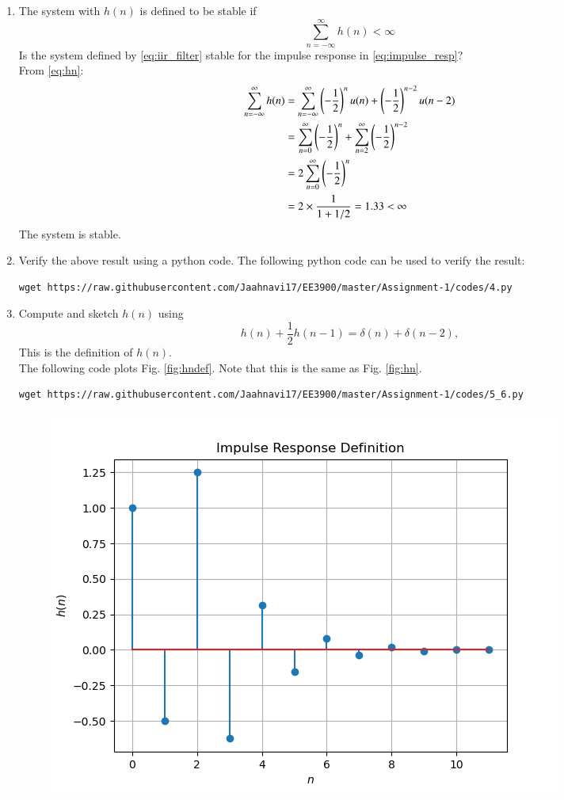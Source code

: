 \documentclass[journal,12pt,twocolumn]{IEEEtran}
\renewcommand\thesection{\arabic{section}}
\begin{document}
\begin{enumerate}[label=\thesection.\arabic*]
%
\item The system with $h(n)$ is defined to be stable if
\begin{equation}
\sum_{n=-\infty}^{\infty}h(n) < \infty
\end{equation}
Is the system defined by \eqref{eq:iir_filter} stable for the impulse response in \eqref{eq:impulse_resp}?
%
\\\solution
From \eqref{eq:hn}:
\begin{align}
    \sum_{n=-\infty}^{\infty} h(n) &= \sum_{n=-\infty}^{\infty}\left(-\frac{1}{2}\right)^{n}u(n) + \left(-\frac{1}{2}\right)^{n-2}u(n-2)\\
    &= \sum_{n=0}^{\infty}\left(-\frac{1}{2}\right)^{n} + \sum_{n=2}^{\infty}\left(-\frac{1}{2}\right)^{n-2}\\
    &= 2\sum_{n=0}^{\infty}\left(-\frac{1}{2}\right)^{n}\\
    &= 2\times\frac{1}{1+1/2}
    = 1.33 < \infty
\end{align}
The system is stable.
\item Verify the above result using a python code.
\solution The following python code can be used to verify the result:
\begin{lstlisting}
wget https://raw.githubusercontent.com/Jaahnavi17/EE3900/master/Assignment-1/codes/4.py
\end{lstlisting}
\item 
Compute and sketch $h(n)$ using 
\begin{equation}
\label{eq:iir_filter_h}
h(n) + \frac{1}{2}h(n-1) = \delta(n) + \delta(n-2), 
\end{equation}
%
This is the definition of $h(n)$.
\\
\solution The following code plots Fig. \ref{fig:hndef}. Note that this is the same as Fig. 
\ref{fig:hn}. 
%
\begin{lstlisting}
wget https://raw.githubusercontent.com/Jaahnavi17/EE3900/master/Assignment-1/codes/5_6.py
\end{lstlisting}
\begin{figure}[!ht]
\centering
\includegraphics[width=\columnwidth]{figures/Figure_4.png}

\end{figure}
\end{enumerate}
\end{document}

